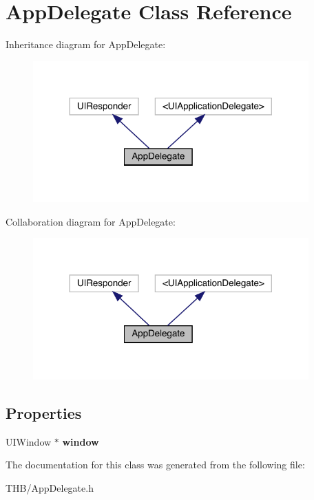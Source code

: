 \hypertarget{interface_app_delegate}{}\section{App\+Delegate Class Reference}
\label{interface_app_delegate}


Inheritance diagram for App\+Delegate\+:\nopagebreak
\begin{figure}[H]
\begin{center}
\leavevmode
\includegraphics[width=300pt]{interface_app_delegate__inherit__graph}
\end{center}
\end{figure}


Collaboration diagram for App\+Delegate\+:\nopagebreak
\begin{figure}[H]
\begin{center}
\leavevmode
\includegraphics[width=300pt]{interface_app_delegate__coll__graph}
\end{center}
\end{figure}
\subsection*{Properties}
\begin{DoxyCompactItemize}
\item 
\mbox{\label{interface_app_delegate_acf48ac24125e688cac1a85445cd7fac2}} 
U\+I\+Window $\ast$ {\bfseries window}
\end{DoxyCompactItemize}


The documentation for this class was generated from the following file\+:\begin{DoxyCompactItemize}
\item 
T\+H\+B/App\+Delegate.\+h\end{DoxyCompactItemize}
